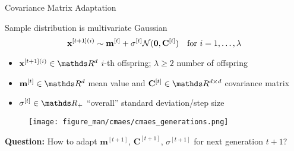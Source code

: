 \documentclass[11pt,compress,t,notes=noshow, xcolor=table]{beamer}
\begin{document}



\begin{vbframe}{Covariance Matrix Adaptation}

Sample distribution is multivariate Gaussian
$$
    \mathbf{x}^{[t+1](i)} \sim \mathbf{m}^{[t]} + \sigma^{[t]} \mathcal{N} (\bm{0}, \mathbf{C}^{[t]}) \quad \text{for } i = 1, \dots, \lambda
$$
\vspace{-20pt}
\begin{itemize}
\item $\xv^{[t+1](i)} \in \R^d$ $i$-th offspring; $\lambda \geq 2$ number of offspring
\item $\mathbf{m}^{[t]} \in \R^d$ mean value and $\mathbf{C}^{[t]} \in \R^{d \times d}$ covariance matrix
\item $\sigma^{[t]} \in \R_{+}$ \enquote{overall} standard deviation/step size
\end{itemize}

\begin{figure}
  \texttt{[image: figure\_man/cmaes/cmaes\_generations.png]}
\end{figure}


\textbf{Question:} How to adapt $\mathbf{m}^{[t+1]}$, $\mathbf{C}^{[t+1]}$, $\sigma^{[t+1]}$ for next generation $t+1$?

\end{vbframe}



\end{document}
